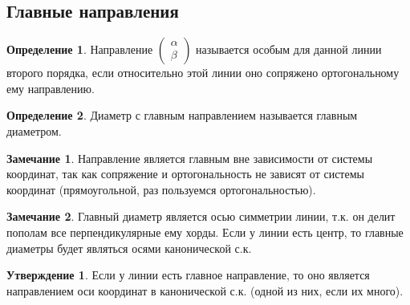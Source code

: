 \documentclass[a4paper, 12pt]{article}
\theoremstyle{definition}
\newtheorem*{definition}{Определение}
\newtheorem*{subtheorem}{Утверждение}
\newtheorem*{remark}{Замечание}
\begin{document}
	\subsection{Главные направления}
	\begin{definition}
		Направление $\begin{pmatrix} \alpha \\ \beta \end{pmatrix}$ называется особым для данной линии второго порядка, если относительно этой линии оно сопряжено ортогональному ему направлению. 
	\end{definition}
	\begin{definition}
		Диаметр с главным направлением называется главным диаметром.
	\end{definition}
	\begin{remark}
		Направление является главным вне зависимости от системы координат, так как сопряжение и ортогональность не зависят от системы координат (прямоугольной, раз пользуемся ортогональностью).
	\end{remark}
	\begin{remark}
		Главный диаметр является осью симметрии линии, т.к. он делит пополам все перпендикулярные ему хорды. Если у линии есть центр, то главные диаметры будет являться осями канонической с.к.
	\end{remark}
	\begin{subtheorem}
		Если у линии есть главное направление, то оно является направлением оси координат в канонической с.к. (одной из них, если их много).
	\end{subtheorem}
\end{document}
